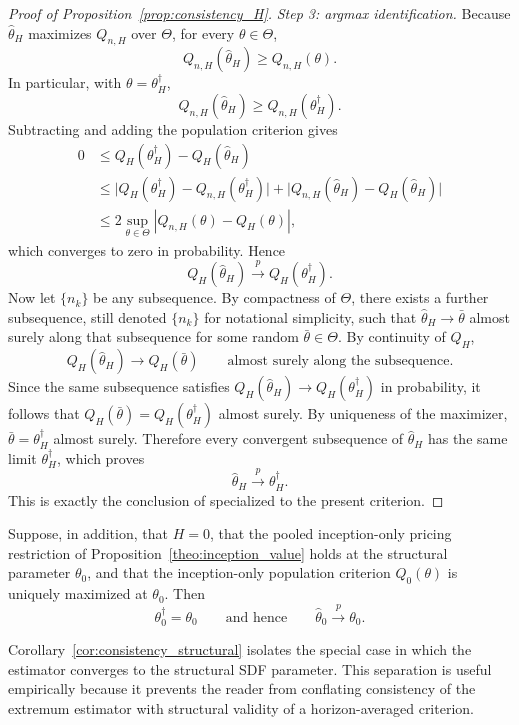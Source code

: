 \begin{proof}[Proof of Proposition~\ref{prop:consistency_H}]
	\emph{Step 3: argmax identification.}
	Because $\hat\theta_H$ maximizes $Q_{n,H}$ over $\Theta$,
	for every $\theta\in\Theta$,
	\[
	Q_{n,H}(\hat\theta_H) \ge Q_{n,H}(\theta).
	\]
	In particular, with $\theta=\theta_H^\dagger$,
	\[
	Q_{n,H}(\hat\theta_H) \ge Q_{n,H}(\theta_H^\dagger).
	\]
	Subtracting and adding the population criterion gives
	\begin{align*}
		0
		&\le
		Q_H(\theta_H^\dagger)-Q_H(\hat\theta_H) \\
		&\le
		\bigl|Q_H(\theta_H^\dagger)-Q_{n,H}(\theta_H^\dagger)\bigr|
		+
		\bigl|Q_{n,H}(\hat\theta_H)-Q_H(\hat\theta_H)\bigr| \\
		&\le
		2
		\sup_{\theta\in\Theta}
		\left|
		Q_{n,H}(\theta)-Q_H(\theta)
		\right|,
	\end{align*}
	which converges to zero in probability.
	Hence
	\[
	Q_H(\hat\theta_H)
	\xrightarrow{p}
	Q_H(\theta_H^\dagger).
	\]
	Now let $\{n_k\}$ be any subsequence. By compactness of $\Theta$, there exists a further subsequence,
	still denoted $\{n_k\}$ for notational simplicity, such that $\hat\theta_H \to \bar\theta$ almost surely along that subsequence for some random $\bar\theta\in\Theta$.
	By continuity of $Q_H$,
	\[
	Q_H(\hat\theta_H) \to Q_H(\bar\theta)
	\qquad\text{almost surely along the subsequence.}
	\]
	Since the same subsequence satisfies
	$Q_H(\hat\theta_H) \to Q_H(\theta_H^\dagger)$ in probability, it follows that
	$Q_H(\bar\theta)=Q_H(\theta_H^\dagger)$ almost surely. By uniqueness of the maximizer,
	$\bar\theta=\theta_H^\dagger$ almost surely.
	Therefore every convergent subsequence of $\hat\theta_H$ has the same limit $\theta_H^\dagger$,
	which proves
	\[
	\hat\theta_H \xrightarrow{p} \theta_H^\dagger.
	\]
	This is exactly the conclusion of \citet[Theorem~2.1]{NM94} specialized to the present criterion.
\end{proof}

\begin{corollary}
	\label{cor:consistency_structural}
	Suppose, in addition, that \(H=0\), that the pooled inception-only pricing restriction of Proposition~\ref{theo:inception_value} holds at the structural parameter \(\theta_0\), and that the inception-only population criterion \(Q_0(\theta)\) is uniquely maximized at \(\theta_0\). Then
	\[
	\theta_0^\dagger = \theta_0
	\qquad \text{and hence} \qquad
	\hat{\theta}_0 \xrightarrow{p} \theta_0.
	\]
\end{corollary}

Corollary~\ref{cor:consistency_structural} isolates the special case in which the estimator converges to the structural SDF parameter. This separation is useful empirically because it prevents the reader from conflating consistency of the extremum estimator with structural validity of a horizon-averaged criterion.

